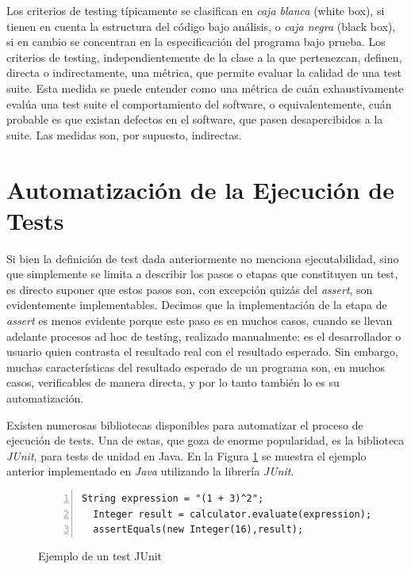 Los criterios de testing t\'ipicamente se clasifican en \emph{caja blanca} (white box), si tienen en cuenta la estructura del c\'odigo bajo an\'alisis, o \emph{caja negra} (black box), si en cambio se concentran en la especificaci\'on del programa bajo prueba. Los criterios de testing, independientemente de la clase a la que pertenezcan, definen, directa o indirectamente, una m\'etrica, que permite evaluar la calidad de una test suite. Esta medida se puede entender como una m\'etrica de cu\'an exhaustivamente eval\'ua una test suite el comportamiento del software, o equivalentemente, cu\'an probable es que existan defectos en el software, que pasen desapercibidos a la suite. Las medidas son, por supuesto, indirectas. 

\section{Automatizaci\'on de la Ejecuci\'on de Tests}
\label{sec:preliminares.testing.automation}

Si bien la definici\'on de test dada anteriormente no menciona ejecutabilidad, sino que simplemente se limita a describir los pasos o etapas que constituyen un test, es directo suponer que estos pasos son, con excepci\'on quiz\'as del \emph{assert}, son evidentemente implementables. Decimos que la implementaci\'on de la etapa de \emph{assert} es menos evidente porque este paso es en muchos casos, cuando se llevan adelante procesos ad hoc de testing, realizado manualmente: es el desarrollador o usuario quien contrasta el resultado real con el resultado esperado. Sin embargo, muchas caracter\'isticas del resultado esperado de un programa son, en muchos casos, verificables de manera directa, y por lo tanto tambi\'en lo es su automatizaci\'on. 

Existen numerosas bibliotecas disponibles para automatizar el proceso de ejecuci\'on de tests. Una de estas, que goza de enorme popularidad, es la biblioteca \emph{JUnit}, para tests de unidad en Java. En la Figura \ref{figures.examples.test.junit} se muestra el ejemplo anterior implementado en \emph{Java} utilizando la librer\'ia \emph{JUnit}.

\begin{figure}[ht!]
	\begin{lstlisting}[frame=single, mathescape=true,numbers=left,framexleftmargin=1.5em]
  String expression = "(1 + 3)^2";
  Integer result = calculator.evaluate(expression);
  assertEquals(new Integer(16),result);
	\end{lstlisting}
	\caption{Ejemplo de un test JUnit}
	\label{figures.examples.test.junit}
\end{figure}

